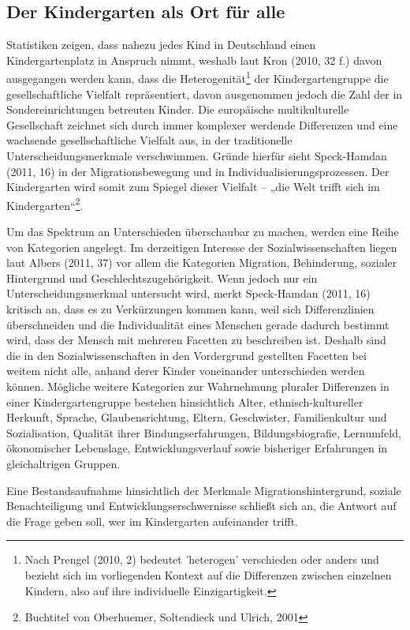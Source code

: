 \subsection{Der Kindergarten als Ort für alle}\label{OrtFuerAlle}
Statistiken zeigen, dass nahezu jedes Kind in Deutschland einen Kindergartenplatz in Anspruch nimmt, weshalb laut Kron (2010, 32 f.) davon ausgegangen werden kann, dass die Heterogenität\footnote{Nach Prengel (2010, 2) bedeutet 'heterogen' verschieden oder anders und bezieht sich im vorliegenden Kontext auf die Differenzen zwischen einzelnen Kindern, also auf ihre individuelle Einzigartigkeit.}
der Kindergartengruppe die gesellschaftliche Vielfalt repräsentiert, davon ausgenommen jedoch die Zahl der in Sondereinrichtungen betreuten Kinder. Die europäische multikulturelle Gesellschaft zeichnet sich durch immer komplexer werdende Differenzen und eine wachsende gesellschaftliche Vielfalt aus, in der traditionelle Unterscheidungsmerkmale verschwimmen. Gründe hierfür sieht Speck-Hamdan (2011, 16) in der Migrationsbewegung und in Individualisierungsprozessen. Der Kindergarten wird somit zum Spiegel dieser Vielfalt – „die Welt trifft sich im Kindergarten“\footnote{Buchtitel von Oberhuemer, Soltendieck und Ulrich, 2001}.
 
Um das Spektrum an Unterschieden überschaubar zu machen, werden eine Reihe von Kategorien angelegt. Im derzeitigen Interesse der Sozialwissenschaften liegen laut Albers (2011, 37) vor allem die Kategorien Migration, Behinderung, sozialer Hintergrund und Geschlechtszugehörigkeit.
Wenn jedoch nur ein Unterscheidungsmerkmal untersucht wird, merkt 
Speck-Hamdan (2011, 16) kritisch an, dass es zu Verkürzungen kommen kann, weil sich Differenzlinien überschneiden und die Individualität eines Menschen gerade dadurch bestimmt wird, dass der Mensch mit mehreren Facetten zu beschreiben ist. Deshalb sind die in den Sozialwissenschaften in den Vordergrund gestellten Facetten bei weitem nicht alle, anhand derer Kinder voneinander unterschieden werden können. Mögliche weitere Kategorien zur Wahrnehmung pluraler Differenzen in einer Kindergartengruppe bestehen hinsichtlich Alter, ethnisch-kultureller Herkunft, Sprache, Glaubensrichtung, Eltern, Geschwister, Familienkultur und Sozialisation, Qualität ihrer Bindungserfahrungen, Bildungsbiografie, Lernumfeld, ökonomischer Lebenslage, Entwicklungsverlauf sowie bisheriger Erfahrungen in gleichaltrigen Gruppen. 

Eine Bestandsaufnahme hinsichtlich der Merkmale Migrationshintergrund, soziale Benachteiligung und Entwicklungserschwernisse schließt sich an, die Antwort auf die Frage geben soll, wer im Kindergarten aufeinander trifft. 

